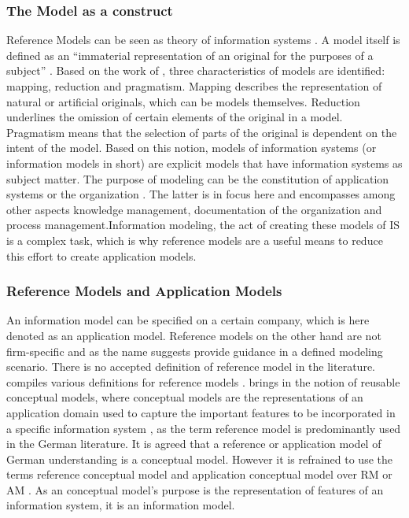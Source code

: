 		\subsubsection{The Model as a construct}
		
		
		Reference Models can be seen as theory of information systems \citep{Schutte1998}. A model itself is defined as an \enquote{immaterial representation of an original for the purposes of a subject} \citep[]{Becker2012Gom}. Based on the work of \cite{Stachowiak1973}, three characteristics of models are identified: mapping, reduction and pragmatism. Mapping describes the representation of natural or artificial originals, which can be models themselves. Reduction underlines the omission of certain elements of the original in a model. Pragmatism means that the selection of parts of the original is dependent on the intent of the model. Based on this notion, models of information systems (or information models in short) are explicit models that have information systems as subject matter. The purpose of modeling can be the constitution of application systems or the organization \citep[]{Rosemann2012proc}. The latter is in focus here and encompasses among other aspects knowledge management, documentation of the organization and process management.Information modeling, the act of creating these models of \acrshort{IS} is a complex task, which is why reference models are a useful means to reduce this effort \citep{Becker2007} to create application models.
		 
			\subsubsection{Reference Models and Application Models}
			An information model can be specified on a certain company, which is here denoted as an application model. Reference models on the other hand are not firm-specific and as the name suggests provide guidance in a defined modeling scenario. There is no accepted definition of reference model in the literature. \citeauthor{thomas2006a} compiles various definitions for reference models \citep{thomas2006a}. \citeauthor{vom2006reusable} brings in the notion of reusable conceptual models, where conceptual models are the representations of an application domain used to capture the important features to be incorporated in a specific information system \citep[]{vom2006reusable}, as the term reference model is predominantly used in the German literature. It is agreed that a reference or application model of German understanding is a conceptual model. However it is refrained to use the terms reference conceptual model and application conceptual model over \acrfull{RM} or \acrfull{AM} . As an conceptual model's purpose is the representation of features of an information system, it is an information model. 
			
